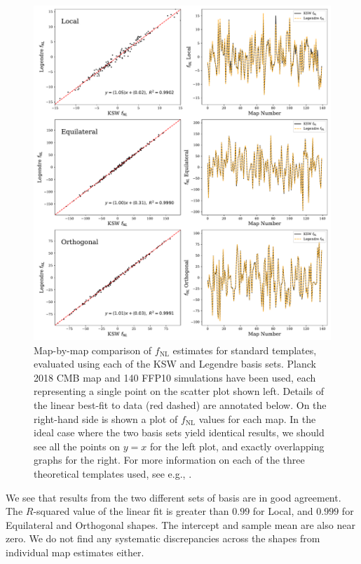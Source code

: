 \begin{figure}[htbp!] 
	\centering 
	\includegraphics[width=\textwidth]{map_by_map_Legendre_KSW.pdf}
	\caption{Map-by-map comparison of $f_\text{NL}$ estimates for standard templates, evaluated using each of the KSW and Legendre basis sets. Planck 2018 CMB map and 140 FFP10 simulations have been used, each representing a single point on the scatter plot shown left. Details of the linear best-fit to data (red dashed) are annotated below. On the right-hand side is shown a plot of $f_\text{NL}$ values for each map. In the ideal case where the two basis sets yield identical results, we should see all the points on $y=x$ for the left plot, and exactly overlapping graphs for the right. For more information on  each of the three theoretical templates used, see e.g., \cite{PlanckCollaboration2013}.}
	\label{fig:map_by_map_Legendre_KSW}
\end{figure}

We see that results from the two different sets of basis are in good agreement. The $R$-squared value of the linear fit is greater than $0.99$ for Local, and $0.999$ for Equilateral and Orthogonal shapes. The intercept and sample mean are also near zero. We do not find any systematic discrepancies across the shapes from individual map estimates either.

